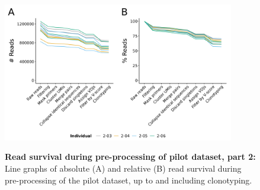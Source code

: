 \begin{figure}
\centering
\includegraphics[width = 0.9\textwidth]{_Figures/png/pilot-read-survival-all.png}
\begin{subfigure}{0em}
\label{fig:igseq-pilot-read-survival-all-a}
\end{subfigure}
\begin{subfigure}{0em}
\label{fig:igseq-pilot-read-survival-all-b}
\end{subfigure}
\caption[Read survival during pre-processing of \igseq pilot dataset, part 2]{\textbf{Read survival during pre-processing of \igseq pilot dataset, part 2:} Line graphs of absolute (A) and relative (B) read survival during pre-processing of the pilot \igseq dataset, up to and including clonotyping.}
\label{fig:igseq-pilot-read-survival-all}
\end{figure}

